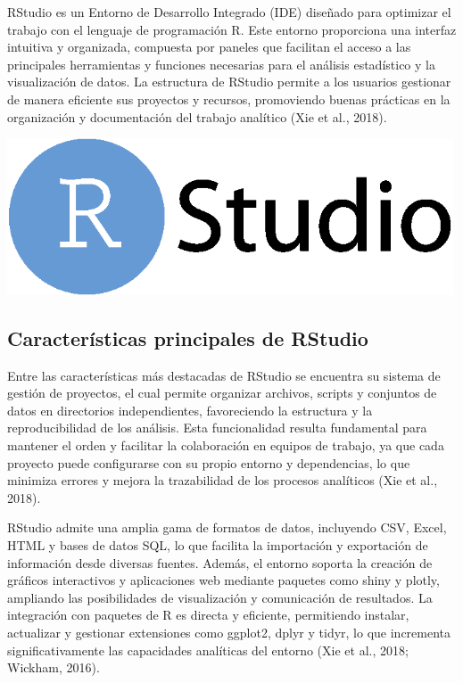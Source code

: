 \documentclass[
  spanish,
  a4paper,
  DIV=11,
  numbers=noendperiod,
  onepage,
  openany]{scrreprt}
\begin{document}
RStudio es un Entorno de Desarrollo Integrado (IDE) diseñado para
optimizar el trabajo con el lenguaje de programación R. Este entorno
proporciona una interfaz intuitiva y organizada, compuesta por paneles
que facilitan el acceso a las principales herramientas y funciones
necesarias para el análisis estadístico y la visualización de datos. La
estructura de RStudio permite a los usuarios gestionar de manera
eficiente sus proyectos y recursos, promoviendo buenas prácticas en la
organización y documentación del trabajo analítico (Xie et al., 2018).

\begin{center}
\includegraphics[width=5.20833in,height=\textheight,keepaspectratio]{index_files/mediabag/RStudio-Logo-All-Col.png}
\end{center}

\subsection{Características principales de
RStudio}\label{caracteruxedsticas-principales-de-rstudio}

Entre las características más destacadas de RStudio se encuentra su
sistema de gestión de proyectos, el cual permite organizar archivos,
scripts y conjuntos de datos en directorios independientes, favoreciendo
la estructura y la reproducibilidad de los análisis. Esta funcionalidad
resulta fundamental para mantener el orden y facilitar la colaboración
en equipos de trabajo, ya que cada proyecto puede configurarse con su
propio entorno y dependencias, lo que minimiza errores y mejora la
trazabilidad de los procesos analíticos (Xie et al., 2018).

RStudio admite una amplia gama de formatos de datos, incluyendo CSV,
Excel, HTML y bases de datos SQL, lo que facilita la importación y
exportación de información desde diversas fuentes. Además, el entorno
soporta la creación de gráficos interactivos y aplicaciones web mediante
paquetes como shiny y plotly, ampliando las posibilidades de
visualización y comunicación de resultados. La integración con paquetes
de R es directa y eficiente, permitiendo instalar, actualizar y
gestionar extensiones como ggplot2, dplyr y tidyr, lo que incrementa
significativamente las capacidades analíticas del entorno (Xie et al.,
2018; Wickham, 2016).
\end{document}
